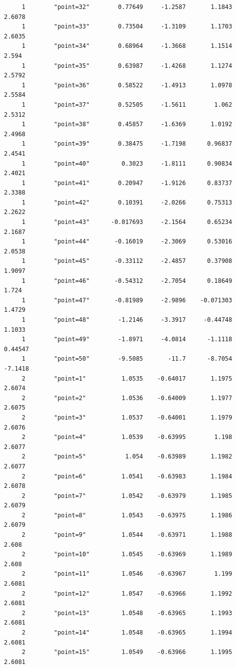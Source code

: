 \documentclass[
]{book}
\begin{document}
\begin{verbatim}
     1        "point=32"        0.77649     -1.2587       1.1843      2.6078
     1        "point=33"        0.73504     -1.3109       1.1703      2.6035
     1        "point=34"        0.68964     -1.3668       1.1514       2.594
     1        "point=35"        0.63987     -1.4268       1.1274      2.5792
     1        "point=36"        0.58522     -1.4913       1.0978      2.5584
     1        "point=37"        0.52505     -1.5611        1.062      2.5312
     1        "point=38"        0.45857     -1.6369       1.0192      2.4968
     1        "point=39"        0.38475     -1.7198      0.96837      2.4541
     1        "point=40"         0.3023     -1.8111      0.90834      2.4021
     1        "point=41"        0.20947     -1.9126      0.83737      2.3388
     1        "point=42"        0.10391     -2.0266      0.75313      2.2622
     1        "point=43"      -0.017693     -2.1564      0.65234      2.1687
     1        "point=44"       -0.16019     -2.3069      0.53016      2.0538
     1        "point=45"       -0.33112     -2.4857      0.37908      1.9097
     1        "point=46"       -0.54312     -2.7054      0.18649       1.724
     1        "point=47"       -0.81989     -2.9896    -0.071303      1.4729
     1        "point=48"        -1.2146     -3.3917     -0.44748      1.1033
     1        "point=49"        -1.8971     -4.0814      -1.1118     0.44547
     1        "point=50"        -9.5085       -11.7      -8.7054     -7.1418
     2        "point=1"          1.0535    -0.64017       1.1975      2.6074
     2        "point=2"          1.0536    -0.64009       1.1977      2.6075
     2        "point=3"          1.0537    -0.64001       1.1979      2.6076
     2        "point=4"          1.0539    -0.63995        1.198      2.6077
     2        "point=5"           1.054    -0.63989       1.1982      2.6077
     2        "point=6"          1.0541    -0.63983       1.1984      2.6078
     2        "point=7"          1.0542    -0.63979       1.1985      2.6079
     2        "point=8"          1.0543    -0.63975       1.1986      2.6079
     2        "point=9"          1.0544    -0.63971       1.1988       2.608
     2        "point=10"         1.0545    -0.63969       1.1989       2.608
     2        "point=11"         1.0546    -0.63967        1.199      2.6081
     2        "point=12"         1.0547    -0.63966       1.1992      2.6081
     2        "point=13"         1.0548    -0.63965       1.1993      2.6081
     2        "point=14"         1.0548    -0.63965       1.1994      2.6081
     2        "point=15"         1.0549    -0.63966       1.1995      2.6081

\end{verbatim}
\end{document}

